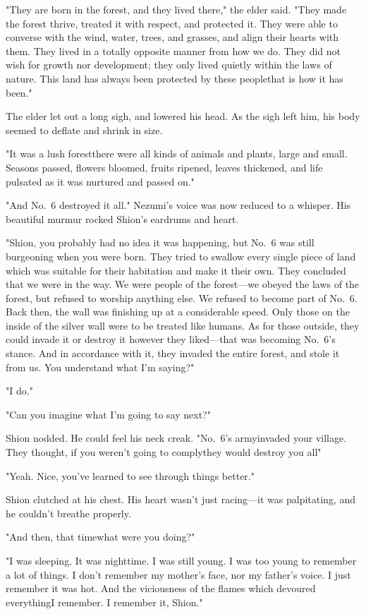 "They are born in the forest, and they lived there," the elder said.
"They made the forest thrive, treated it with respect, and protected it.
They were able to converse with the wind, water, trees, and grasses, and
align their hearts with them. They lived in a totally opposite manner
from how we do. They did not wish for growth nor development; they only
lived quietly within the laws of nature. This land has always been
protected by these people\el that is how it has been."

The elder let out a long sigh, and lowered his head. As the sigh left
him, his body seemed to deflate and shrink in size.

"It was a lush forest\el there were all kinds of animals and plants,
large and small. Seasons passed, flowers bloomed, fruits ripened, leaves
thickened, and life pulsated as it was nurtured and passed on."

"And No.~6 destroyed it all." Nezumi's voice was now reduced to a
whisper. His beautiful murmur rocked Shion's eardrums and heart.

"Shion, you probably had no idea it was happening, but No.~6 was still
burgeoning when you were born. They tried to swallow every single piece
of land which was suitable for their habitation and make it their own.
They concluded that we were in the way. We were people of the forest---we
obeyed the laws of the forest, but refused to worship anything else. We
refused to become part of No.~6. Back then, the wall was finishing up at
a considerable speed. Only those on the inside of the silver wall were
to be treated like humans. As for those outside, they could invade it or
destroy it however they liked---that was becoming No.~6's stance. And in
accordance with it, they invaded the entire forest, and stole it from
us. You understand what I'm saying?"

"I do."

"Can you imagine what I'm going to say next?"

Shion nodded. He could feel his neck creak. "No.~6's army\el invaded
your village. They thought, if you weren't going to comply\el they would
destroy you all\el "

"Yeah. Nice, you've learned to see through things better."

Shion clutched at his chest. His heart wasn't just racing---it was
palpitating, and he couldn't breathe properly.

"And then, that time\el what were you doing\el ?"

"I was sleeping. It was nighttime. I was still young. I was too young\el 
to remember a lot of things. I don't remember my mother's face, nor my
father's voice. I just remember it was hot. And the viciousness of the
flames which devoured everything\el I remember. I remember it, Shion."

